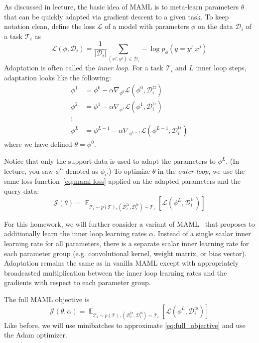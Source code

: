 \documentclass[12pt]{article}
\DeclareMathOperator{\E}{\mathbb{E}}
\newcommand{\dataset}{\mathcal{D}}
\newcommand{\task}{\mathcal{T}}
\newcommand{\supportdata}{\mathcal{D}^\mathrm{tr}}
\newcommand{\querydata}{\mathcal{D}^\mathrm{ts}}
\begin{document}
As discussed in lecture, the basic idea of MAML is to meta-learn parameters $\theta$ that can be quickly adapted via gradient descent to a given task. To keep notation clean, define the loss $\mathcal{L}$ of a model with parameters $\phi$ on the data $\dataset_i$ of a task $\task_i$ as
\begin{equation}\label{eq:maml loss}
    \mathcal{L}(\phi, \dataset_i) = \frac{1}{\lvert \dataset_i \rvert} \sum_{(x^j, y^j) \in \dataset_i} -\log p_\phi (y = y^j | x^j)
\end{equation}
Adaptation is often called the \emph{inner loop}. For a task $\task_i$ and $L$ inner loop steps, adaptation looks like the following:
\begin{equation}
\begin{aligned}
    \phi^1 &= \phi^0 - \alpha \nabla_{\phi^0} \mathcal{L}(\phi^0, \supportdata_i) \\
    \phi^2 &= \phi^1 - \alpha \nabla_{\phi^1} \mathcal{L}(\phi^1, \supportdata_i) \\
    \vdots \\
    \phi^L &= \phi^{L-1} - \alpha \nabla_{\phi^{L-1}} \mathcal{L}(\phi^{L-1}, \supportdata_i)
\end{aligned}
\end{equation}
where we have defined $\theta = \phi^0$.


Notice that only the support data is used to adapt the parameters to $\phi^L$. (In lecture, you saw $\phi^L$ denoted as $\phi_i$.) To optimize $\theta$ in the \emph{outer loop}, we use the same loss function~\eqref{eq:maml loss} applied on the adapted parameters and the query data:
\begin{equation}
    \mathcal{J}(\theta) = \E_{\task_i \sim p(\task), (\supportdata_i, \querydata_i) \sim \task_i} \left[ \mathcal{L}(\phi^L, \querydata_i) \right] \label{eq:maml_objective}
\end{equation}


For this homework, we will further consider a variant of MAML~\cite{mamlplusplus} that proposes to additionally learn the inner loop learning rates $\alpha$. Instead of a single scalar inner learning rate for all parameters, there is a separate scalar inner learning rate for each parameter group (e.g. convolutional kernel, weight matrix, or bias vector). Adaptation remains the same as in vanilla MAML except with appropriately broadcasted multiplication between the inner loop learning rates and the gradients with respect to each parameter group. 

The full MAML objective is
\begin{equation}
    \mathcal{J}(\theta, \alpha) = \E_{\task_i \sim p(\task), (\supportdata_i, \querydata_i) \sim \task_i} \left[ \mathcal{L}(\phi^L, \querydata_i) \right] \label{eq:full_objective}
\end{equation}
Like before, we will use minibatches to approximate \eqref{eq:full_objective} and use the Adam optimizer.
\end{document}
